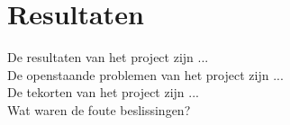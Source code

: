 \chapter{Resultaten}
De resultaten van het project zijn ...\\
De openstaande problemen van het project zijn ...\\
De tekorten van het project zijn ...\\
Wat waren de foute beslissingen?